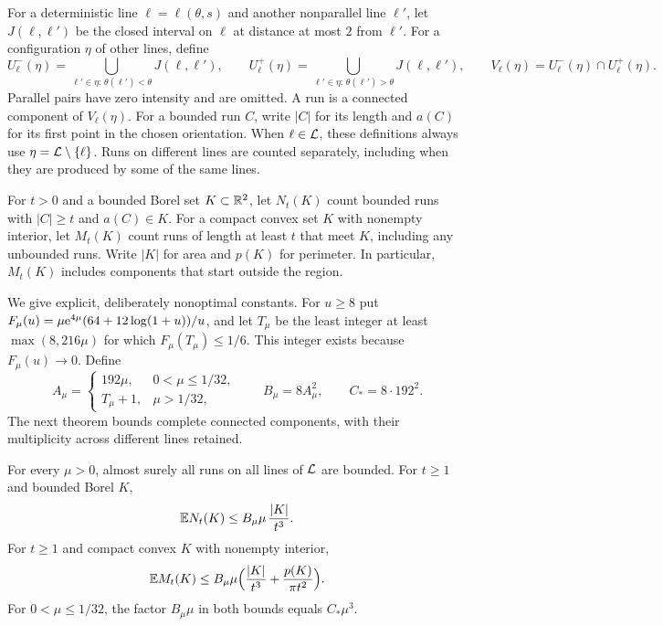 \documentclass[11pt,letterpaper]{article}
\begin{document}
For a deterministic line $\ell=\ell(\theta,s)$ and another nonparallel line $\ell'$, let $J(\ell,\ell')$ be the closed interval on $\ell$ at distance at most $2$ from $\ell'$. For a configuration $\eta$ of other lines, define
\[
 U_\ell^-(\eta)=\bigcup_{\ell'\in\eta:\,\theta(\ell')<\theta}J(\ell,\ell'),
 \qquad
 U_\ell^+(\eta)=\bigcup_{\ell'\in\eta:\,\theta(\ell')>\theta}J(\ell,\ell'),
 \qquad V_\ell(\eta)=U_\ell^-(\eta)\cap U_\ell^+(\eta).
\]
Parallel pairs have zero intensity and are omitted. A run is a connected component of $V_\ell(\eta)$. For a bounded run $C$, write $|C|$ for its length and $a(C)$ for its first point in the chosen orientation. When $\ell\in\mathcal L$, these definitions always use $\eta=\mathcal L\setminus\{\ell\}$. Runs on different lines are counted separately, including when they are produced by some of the same lines.

For $t>0$ and a bounded Borel set $K\subset\mathbb R^2$, let $N_t(K)$ count bounded runs with $|C|\ge t$ and $a(C)\in K$. For a compact convex set $K$ with nonempty interior, let $M_t(K)$ count runs of length at least $t$ that meet $K$, including any unbounded runs. Write $|K|$ for area and $p(K)$ for perimeter. In particular, $M_t(K)$ includes components that start outside the region.

We give explicit, deliberately nonoptimal constants. For $u\ge8$ put $F_\mu(u)=\mu\mathrm{e}^{4\mu}(64+12\log(1+u))/u$, and let $T_\mu$ be the least integer at least $\max(8,216\mu)$ for which $F_\mu(T_\mu)\le1/6$. This integer exists because $F_\mu(u)\to0$. Define
\[
 A_\mu=
 \begin{cases}
  192\mu,&0<\mu\le1/32,\\
  T_\mu+1,&\mu>1/32,
 \end{cases}
 \qquad B_\mu=8A_\mu^2,
 \qquad C_*=8\cdot192^2.
\]
The next theorem bounds complete connected components, with their multiplicity across different lines retained.

\begin{theorem}\label{thm:runs}
For every $\mu>0$, almost surely all runs on all lines of $\mathcal L$ are bounded. For $t\ge1$ and bounded Borel $K$,
\begin{equation}\label{eq:starts}
 \mathbb E N_t(K)\le B_\mu\mu\,\frac{|K|}{t^3}.
\end{equation}
For $t\ge1$ and compact convex $K$ with nonempty interior,
\begin{equation}\label{eq:meeting}
 \mathbb E M_t(K)\le B_\mu\mu
       \Big(\frac{|K|}{t^3}+\frac{p(K)}{\pi t^2}\Big).
\end{equation}
For $0<\mu\le1/32$, the factor $B_\mu\mu$ in both bounds equals $C_*\mu^3$.
\end{theorem}
\end{document}
